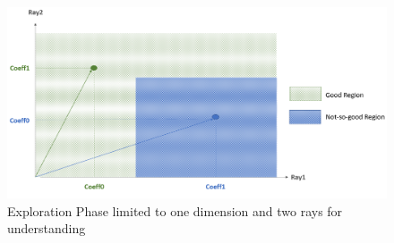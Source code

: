 \documentclass[logo,msc]{infthesis}           %
\begin{document}
\begin{figure}[htbp]
  \centering
  \includegraphics[width=\textwidth]{Images/Exploration.png}    
  \caption{Exploration Phase limited to one dimension and two rays for understanding}
  \label{fig:exploration}
\end{figure}
\end{document}
